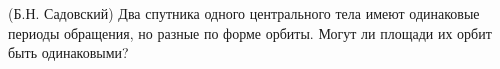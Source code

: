 (Б.Н. Садовский)
Два спутника одного центрального тела имеют одинаковые периоды
обращения, но разные по форме орбиты. Могут ли площади их орбит быть
одинаковыми?
